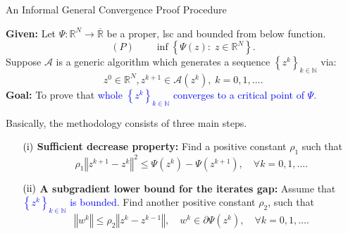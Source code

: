 \documentclass[9pt,handout]{beamer} %
\newcommand{\rr}{\mathbb{R}} %
\newcommand{\norm}[1]{\left\Vert {#1} \right\Vert} %
\newcommand{\Seq}[2]{\left\{{#1}^{{#2}}\right\}_{{#2} \in \mathbb{N}}}
\begin{document}
	\begin{frame}{An Informal General Convergence Proof Procedure}
	
    	{\bf Given:} Let $\Psi : \rr^{N} \rightarrow \overline{\rr}$ be a proper, lsc and 
    	bounded from below function.
        \begin{equation*}
        	(P) \qquad \inf \left\{ \Psi\left(z\right) : \; z \in \rr^{N} \right\}.
        \end{equation*}
        Suppose $\mathcal{A}$ is a generic algorithm which generates a sequence $\Seq{z}{k}$ 
        via:
        \begin{equation*}
            z^{0} \in \rr^{N},  z^{k+1} \in \mathcal{A}\left(z^{k}\right), \; k = 0 , 1 , 
            \ldots.
        \end{equation*}
        \pause
        {\bf Goal:} To prove that \textcolor{blue}{whole $\Seq{z}{k}$ converges to a critical 		point of $\Psi$.}
        \pause
        \vspace{0.1in}

        Basically, the methodology consists of three main steps.
        \begin{itemize}
            \item[$\rm{(i)}$] {\bf Sufficient decrease property:} Find a positive constant 
            	$\rho_{1}$ such that
                \begin{equation*}
                    \rho_{1}\norm{z^{k + 1} - z^{k}}^{2} \leq \Psi\left(z^{k}\right) - 
                    \Psi\left(z^{k + 1}\right), \quad \forall k = 0 , 1 , \ldots.
                \end{equation*}
                \pause
                \vspace{-0.1in}
            \item[$\rm{(ii)}$] {\bf A subgradient lower bound for the iterates gap:} Assume 
            	that \textcolor{blue}{$\Seq{z}{k}$ is bounded}. Find another positive 
            	constant $\rho_{2}$, such that
                \begin{equation*}
                    \norm{w^{k}} \leq \rho_{2}\norm{z^{k} - z^{k - 1}}, \quad w^{k} \in 
                    \partial \Psi\left(z^{k}\right), \quad \forall k = 0 , 1 , \ldots.
                \end{equation*}
		\end{itemize}
        \pause
        \begin{center}
        \end{center}
	\end{frame}
\end{document}
